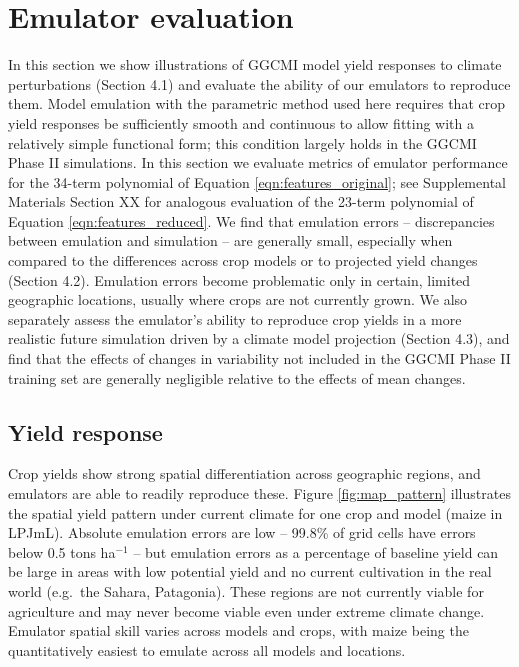 \documentclass[gmd, manuscript]{copernicus} %
\begin{document}
\section{Emulator evaluation}
\label{S:4}
In this section we show illustrations of GGCMI model yield responses to climate perturbations (Section 4.1) and evaluate the ability of our emulators to reproduce them.   
Model emulation with the parametric method used here requires that crop yield responses be sufficiently smooth and continuous to allow fitting with a relatively simple functional form; this condition largely holds in the GGCMI Phase II simulations. 
In this section we evaluate metrics of emulator performance for the 34-term polynomial of Equation \ref{eqn:features_original}; see Supplemental Materials Section XX for analogous evaluation of the 23-term polynomial of Equation \ref{eqn:features_reduced}.
We find that emulation errors -- discrepancies between emulation and simulation -- are generally small, especially when compared to the differences across crop models or to projected yield changes (Section 4.2).
Emulation errors become problematic only in certain, limited geographic locations, usually where crops are not currently grown. 
We also separately assess the emulator's ability to reproduce crop yields in a more realistic future simulation driven by a climate model projection (Section 4.3), and find that the effects of changes in variability not included in the GGCMI Phase II training set are generally negligible relative to the effects of mean changes.

\subsection{Yield response}
\label{S:4.1}
Crop yields show strong spatial differentiation across geographic regions, and emulators are able to readily reproduce these. Figure \ref{fig:map_pattern} illustrates the spatial yield pattern under current climate for one crop and model (maize in LPJmL). Absolute emulation errors are low --  99.8\% of grid cells have errors below 0.5 tons ha$^{-1}$ -- but 
emulation errors as a percentage of baseline yield can be large in areas with low potential yield and no current cultivation in the real world (e.g.\ the Sahara, Patagonia).
These regions are not currently viable for agriculture and may never become viable even under extreme climate change.  
Emulator spatial skill varies across models and crops, with maize being the quantitatively easiest to emulate across all models and locations.
\end{document}

